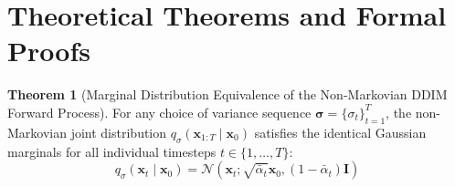 \documentclass[11pt,a4paper]{article}
\theoremstyle{definition}
\newtheorem{theorem}{\textbf{Theorem}}[section]
\begin{document}
\section{Theoretical Theorems and Formal Proofs}

\begin{theorem}[Marginal Distribution Equivalence of the Non-Markovian DDIM Forward Process]
For any choice of variance sequence $\boldsymbol{\sigma} = \{\sigma_t\}_{t=1}^T$, the non-Markovian joint distribution $q_\sigma(\mathbf{x}_{1:T} \mid \mathbf{x}_0)$ satisfies the identical Gaussian marginals for all individual timesteps $t \in \{1, \dots, T\}$:
{\boldmath
\begin{equation}
q_\sigma(\mathbf{x}_t \mid \mathbf{x}_0) = \mathcal{N}\left(\mathbf{x}_t; \sqrt{\bar{\alpha}_t}\mathbf{x}_0, (1 - \bar{\alpha}_t)\mathbf{I}\right)
\end{equation}
}
\end{theorem}
\end{document}
